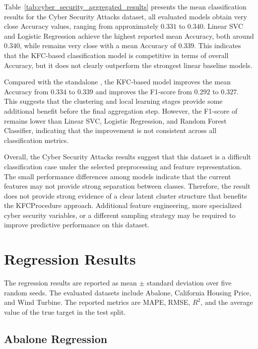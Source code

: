 \hs Table~\ref{tab:cyber_security_aggregated_results} presents the mean classification results for the Cyber Security Attacks dataset, all evaluated models obtain very close Accuracy values, ranging from approximately $0.331$ to $0.340$. Linear SVC and Logistic Regression achieve the highest reported mean Accuracy, both around $0.340$, while  remains very close with a mean Accuracy of $0.339$. This indicates that the KFC-based classification model is competitive in terms of overall Accuracy, but it does not clearly outperform the strongest linear baseline models.

Compared with the standalone , the KFC-based model improves the mean Accuracy from $0.334$ to $0.339$ and improves the F1-score from $0.292$ to $0.327$. This suggests that the clustering and local learning stages provide some additional benefit before the final aggregation step. However, the F1-score of  remains lower than Linear SVC, Logistic Regression, and Random Forest Classifier, indicating that the improvement is not consistent across all classification metrics.

Overall, the Cyber Security Attacks results suggest that this dataset is a difficult classification case under the selected preprocessing and feature representation. The small performance differences among models indicate that the current features may not provide strong separation between classes. Therefore, the result does not provide strong evidence of a clear latent cluster structure that benefits the KFCProcedure approach. Additional feature engineering, more specialized cyber security variables, or a different sampling strategy may be required to improve predictive performance on this dataset.

\section{Regression Results}
\label{sec:regression_results}

\hs The regression results are reported as mean $\pm$ standard deviation over five random seeds. The evaluated datasets include Abalone, California Housing Price, and Wind Turbine. The reported metrics are MAPE, RMSE, $R^2$, and the average value of the true target in the test split.

\subsection{Abalone Regression}

